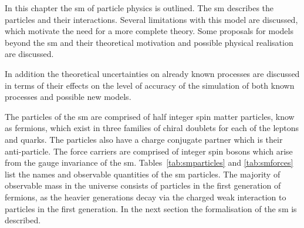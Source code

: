 
In this chapter the \ac{sm} of particle physics is outlined. The 
\ac{sm} describes the particles and their interactions. Several limitations 
with this model are discussed, which motivate the need for a more complete 
theory. Some proposals for models beyond the \ac{sm} and their theoretical 
motivation and possible physical realisation are discussed.

In addition the theoretical uncertainties on already known processes are 
discussed in terms of their effects on the level of accuracy of the simulation 
of both known processes and possible new models.

The particles of the \ac{sm} are comprised of half integer spin matter 
particles, know as fermions, which exist in three families of chiral doublets 
for each of the leptons and quarks. The particles also have a charge conjugate partner which is their anti-particle.
The force carriers are comprised of integer spin bosons which arise from the 
gauge invariance of the \ac{sm}. Tables~\ref{tab:smparticles} and 
\ref{tab:smforces} list the names and observable quantities of the \ac{sm} 
particles. The majority of observable mass in the universe consists of 
particles in the first generation of fermions, as the heavier generations decay 
via the charged weak interaction to particles in the first generation.
In the next section the formalisation of the \ac{sm} is described.

